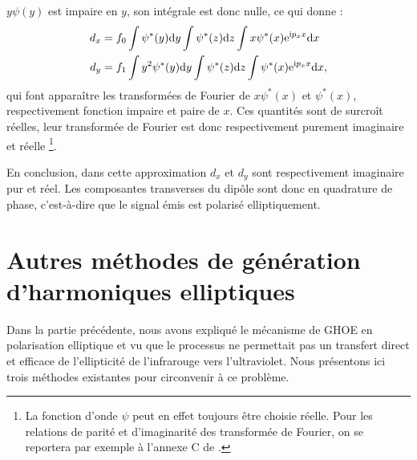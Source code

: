 $y\psi(y)$ est impaire en $y$, son intégrale est donc nulle, ce qui donne :
\begin{align}
d_x &= f_0\int{\psi^*(y)\mathrm{d}y}\int{\psi^*(z)\mathrm{d}z}\int{x\psi^*(x)\mathrm{e}^{\mathrm{i}p_x x}\mathrm{d}x}\nonumber\\
d_y &= f_1\int{y^2 \psi^*(y)\mathrm{d}y}\int{\psi^*(z)\mathrm{d}z}\int{\psi^*(x)\mathrm{e}^{\mathrm{i}p_x x}\mathrm{d}x},
\end{align}
qui font apparaître les transformées de Fourier de $x\psi^*(x)$ et $\psi^*(x)$, respectivement fonction impaire et paire de $x$. Ces quantités sont de surcroît réelles, leur transformée de Fourier est donc respectivement purement imaginaire et réelle \footnote{La fonction d'onde $\psi$ peut en effet toujours être choisie réelle. Pour les relations de parité et d'imaginarité des transformée de Fourier, on se reportera par exemple à l'annexe C de .}.

En conclusion, dans cette approximation $d_x$ et $d_y$ sont respectivement imaginaire pur et réel. Les composantes transverses du dipôle sont donc en quadrature de phase, c'est-à-dire que le signal émis est polarisé elliptiquement.

\section{Autres méthodes de génération d'harmoniques elliptiques}
Dans la partie précédente, nous avons expliqué le mécanisme de GHOE en polarisation elliptique et vu que le processus ne permettait pas un transfert direct et efficace de l'ellipticité de l'infrarouge vers l'ultraviolet. Nous présentons ici trois méthodes existantes pour circonvenir à ce problème. 

